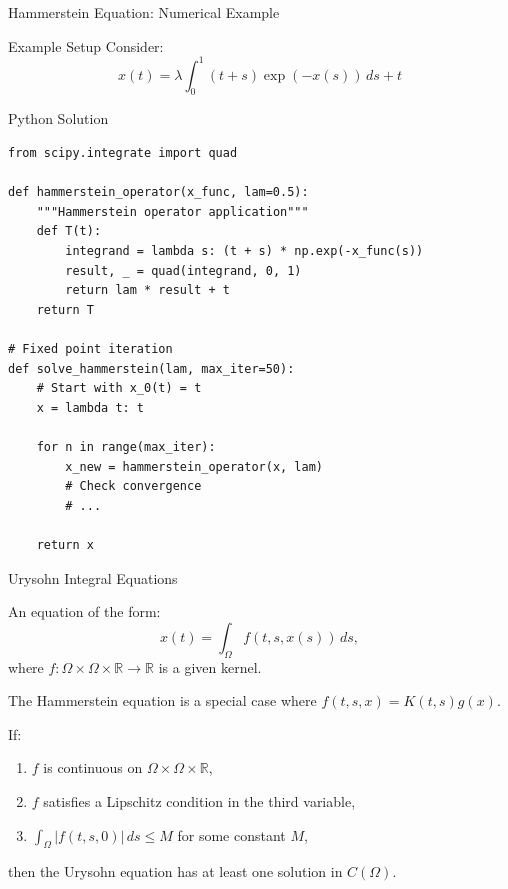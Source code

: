 \documentclass[aspectratio=169,10pt]{beamer}
\begin{document}
\begin{frame}[fragile]{Hammerstein Equation: Numerical Example}
  \begin{block}{Example Setup}
    Consider:
    \[
      x(t) = \lambda \int_0^1 (t + s) \exp(-x(s)) \, ds + t
    \]
  \end{block}

  \vspace{0.3cm}

  \begin{block}{Python Solution}
    \begin{lstlisting}
from scipy.integrate import quad

def hammerstein_operator(x_func, lam=0.5):
    """Hammerstein operator application"""
    def T(t):
        integrand = lambda s: (t + s) * np.exp(-x_func(s))
        result, _ = quad(integrand, 0, 1)
        return lam * result + t
    return T

# Fixed point iteration
def solve_hammerstein(lam, max_iter=50):
    # Start with x_0(t) = t
    x = lambda t: t

    for n in range(max_iter):
        x_new = hammerstein_operator(x, lam)
        # Check convergence
        # ...

    return x
    \end{lstlisting}
  \end{block}
\end{frame}

\begin{frame}{Urysohn Integral Equations}
  \begin{definition}
    An equation of the form:
    \[
      x(t) = \int_\Omega f(t, s, x(s)) \, ds,
    \]
    where $f: \Omega \times \Omega \times \mathbb{R} \to \mathbb{R}$ is a given kernel.
  \end{definition}

  \vspace{0.4cm}

  \begin{remark}
    The Hammerstein equation is a special case where $f(t,s,x) = K(t,s) g(x)$.
  \end{remark}

  \vspace{0.4cm}

  \begin{theorem}
    If:
    \begin{enumerate}
      \item $f$ is continuous on $\Omega \times \Omega \times \mathbb{R}$,
      \item $f$ satisfies a Lipschitz condition in the third variable,
      \item $\int_\Omega |f(t,s,0)| \, ds \leq M$ for some constant $M$,
    \end{enumerate}
    then the Urysohn equation has at least one solution in $C(\Omega)$.
  \end{theorem}
\end{frame}
\end{document}
